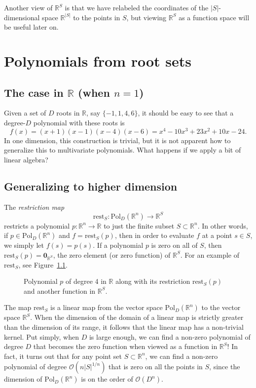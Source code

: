 \documentclass[oneside,a4paper]{memoir}
\newcommand{\rfig}[1]{Figure~\ref{fig:#1}}
\newcommand{\BigO}{\mathcal{O}}
\newcommand{\reals}{\mathbb{R}}
\newcommand{\Pol}[2]{\mathrm{Pol}_#1(\reals^#2)}
\newcommand{\PolDn}{\Pol Dn}
\newcommand{\StoR}{\reals^S}
\newcommand{\rest}{\mathrm{rest}}
\newcommand{\restS}{\rest_S}
\newcommand{\Ssz}{|S|}
\newcommand{\V}[1]{\mathbf{#1}}
\begin{document}
Another view of $\StoR$ is that we have relabeled
the coordinates of the $\Ssz$-dimensional space $\reals^{\Ssz}$
to the points in $S$,
but viewing $\StoR$ as a function space will be useful later on.

\chapter{Polynomials from root sets}

\section{The case in $\reals$ (when $n = 1$)}

Given a set of $D$ roots in $\reals$,
say $\{-1, 1, 4, 6\}$,
it should be easy to see that a degree-$D$ polynomial with these roots is
\[f(x) = (x + 1)(x - 1)(x - 4)(x - 6) = x^4 - 10 x^3 + 23 x^2 + 10 x - 24.\]
In one dimension, this construction is trivial,
but it is not apparent how to generalize this to multivariate polynomials.
What happens if we apply a bit of linear algebra?

\section{Generalizing to higher dimension}

The \emph{restriction map}
\[\restS : \PolDn \to \StoR\]
restricts a polynomial $p : \reals^n \to \reals$ to just the finite subset
$S \subset \reals^n$. In other words, if $p \in \PolDn$
and $f = \restS(p)$, then in order to evaluate $f$ at a point $s \in S$,
we simply let $f(s) = p(s)$. If a polynomial $p$ is zero on all of $S$,
then $\restS(p) = \V 0_{\StoR}$, the zero element (or zero function) of $\StoR$.
For an example of $\restS$, see \rfig{rest}.

\begin{figure}

\caption{
  Polynomial $p$ of degree 4 in $\reals$ along with its restriction
  $\restS(p)$ and another function in $\StoR$.
}
\label{fig:rest}
\end{figure}

The map $\restS$ is a linear map from the vector space $\PolDn$ %
to the vector space $\StoR$. %
When the dimension of the domain of a linear map is strictly greater than the
dimension of its range, it follows that the linear map has a non-trivial kernel.
Put simply, when $D$ is large enough, we can find a non-zero polynomial of
degree $D$ that becomes the zero function when viewed as a function in $\StoR$!
In fact, it turns out that for any point set $S \subset \reals^n$,
we can find a non-zero polynomial of degree $\BigO(n\Ssz^{1/n})$
that is zero on all the points in $S$,
since the dimension of $\PolDn$ is on the order of $\BigO(D^n)$.
\end{document}
